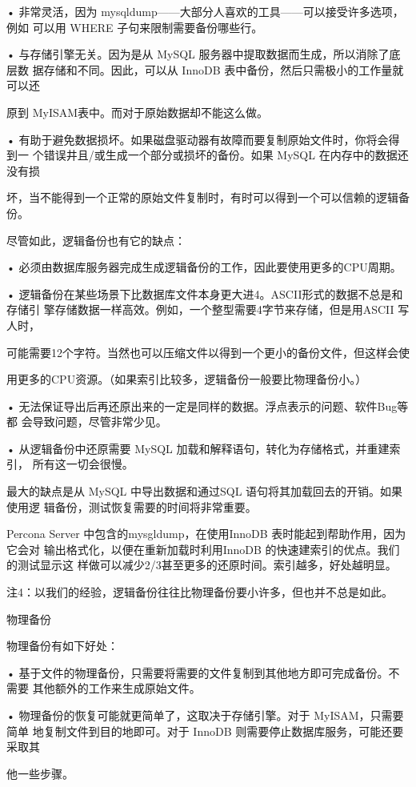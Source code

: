 • 非常灵活，因为 mysqldump——大部分人喜欢的工具——可以接受许多选项，例如
可以用 WHERE 子句来限制需要备份哪些行。

• 与存储引擎无关。因为是从 MySQL 服务器中提取数据而生成，所以消除了底层数
据存储和不同。因此，可以从 InnoDB 表中备份，然后只需极小的工作量就可以还

原到 MyISAM表中。而对于原始数据却不能这么做。

• 有助于避免数据损坏。如果磁盘驱动器有故障而要复制原始文件时，你将会得到一
个错误井且/或生成一个部分或损坏的备份。如果 MySQL 在内存中的数据还没有损

坏，当不能得到一个正常的原始文件复制时，有时可以得到一个可以信赖的逻辑备份。

尽管如此，逻辑备份也有它的缺点：

• 必须由数据库服务器完成生成逻辑备份的工作，因此要使用更多的CPU周期。

• 逻辑备份在某些场景下比数据库文件本身更大进4。ASCII形式的数据不总是和存储引
擎存储数据一样高效。例如，一个整型需要4字节来存储，但是用ASCII 写人时，

可能需要12个字符。当然也可以压缩文件以得到一个更小的备份文件，但这样会使

用更多的CPU资源。（如果索引比较多，逻辑备份一般要比物理备份小。）

• 无法保证导出后再还原出来的一定是同样的数据。浮点表示的问题、软件Bug等都
会导致问题，尽管非常少见。

• 从逻辑备份中还原需要 MySQL 加载和解释语句，转化为存储格式，并重建索引，
所有这一切会很慢。

最大的缺点是从 MySQL 中导出数据和通过SQL 语句将其加载回去的开销。如果使用逻
辑备份，测试恢复需要的时间将非常重要。

Percona Server 中包含的mysgldump，在使用InnoDB 表时能起到帮助作用，因为它会对
输出格式化，以便在重新加载时利用InnoDB 的快速建索引的优点。我们的测试显示这
样做可以减少2/3甚至更多的还原时间。索引越多，好处越明显。

注4：以我们的经验，逻辑备份往往比物理备份要小许多，但也并不总是如此。

物理备份

物理备份有如下好处：

• 基于文件的物理备份，只需要将需要的文件复制到其他地方即可完成备份。不需要
其他额外的工作来生成原始文件。

• 物理备份的恢复可能就更简单了，这取决于存储引擎。对于 MyISAM，只需要简单
地复制文件到目的地即可。对于 InnoDB 则需要停止数据库服务，可能还要采取其

他一些步骤。

